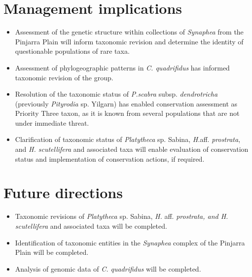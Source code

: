 \documentclass[version=last,
    paper=a4, %
    10pt, %
    usenames,
    dvipsnames,
    oneside, %
    headings=openany, %
    DIV=15 %
]{scrbook}
\begin{document}
\section*{Management implications}
\begin{itemize}
\itemsep1pt\parskip0pt
\item
  Assessment of the genetic structure within collections of
  \emph{Synaphea} from the Pinjarra Plain will inform taxonomic revision
  and determine the identity of questionable populations of rare taxa.
\item
  Assessment of phylogeographic patterns in \emph{C. quadrifidus} has
  informed taxonomic revision of the group.
\item
  Resolution of the taxonomic status of \emph{P.}\emph{scabra} subsp.
  \emph{dendrotricha} (previously \emph{Pityrodia} sp. Yilgarn) has
  enabled conservation assessment as Priority Three taxon, as it is
  known from several populations that are not under immediate threat.
\item
  Clarification of taxonomic status of \emph{Platytheca} sp. Sabina,
  \emph{H.}aff. \emph{prostrata}, and \emph{H. scutellifera} and
  associated taxa will enable evaluation of conservation status and
  implementation of conservation actions, if required.
\end{itemize}



\section*{Future directions}
\begin{itemize}
\itemsep1pt\parskip0pt
\item
  Taxonomic revisions of \emph{Platytheca} sp. Sabina, \emph{H.} aff.
  \emph{prostrata, and H.} \emph{scutellifera} and associated taxa will
  be completed.
\item
  Identification of taxonomic entities in the \emph{Synaphea} complex of
  the Pinjarra Plain will be completed.
\item
  Analysis of genomic data of \emph{C. quadrifidus} will be completed.
\end{itemize}



\end{document}
